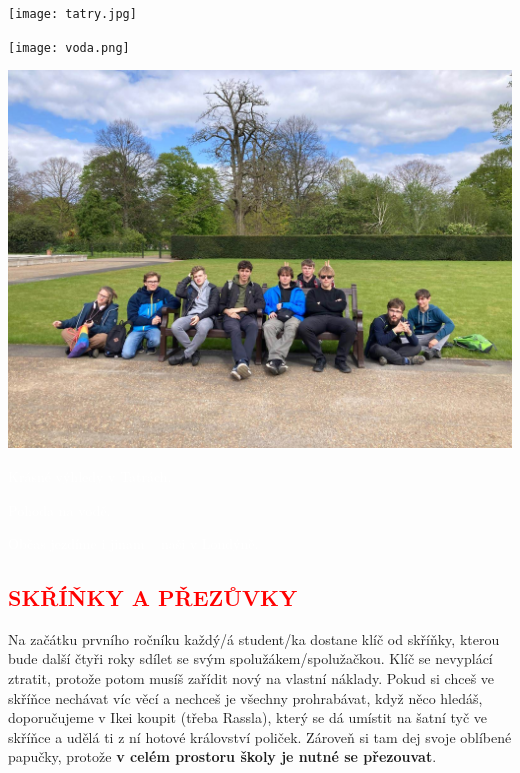 \documentclass[a5paper, twoside]{article}
\newcommand{\boxik}[2]{
  \begin{tcolorbox}[
    sharp corners,
    colback = #1,
    boxrule = 0pt,
    grow to left by = 25pt,
    grow to right by = 25pt,
    right = 22pt,
    left = 22pt%
  ]
    #2
  \end{tcolorbox}
}
\newcommand{\podnadpis}[2]{
  \subsection*{\textcolor{#2}{#1}}
}
\begin{document}
\smallskip
\boxik{red}{
\begin{minipage}{\linewidth}
  \begin{minipage}{0.32\linewidth}
    \texttt{[image: tatry.jpg]}
  \end{minipage}
  \hfill
  \begin{minipage}{0.32\linewidth}
    \texttt{[image: voda.png]}
  \end{minipage}
  \hfill
  \begin{minipage}{0.32\linewidth}
    \includegraphics[width=\linewidth]{londyn.jpg}
  \end{minipage}
\end{minipage}
\newline
\noindent
\begin{minipage}{\linewidth}
  \vspace{0.75em}
  \begin{minipage}{0.32\linewidth}
    \centering \textcolor{white}{Krásné výhledy v Tatrách.}
  \end{minipage}
  \hfill
  \begin{minipage}{0.32\linewidth}
    \centering \textcolor{white}{Pohoda na vodě.}
  \end{minipage}
  \hfill
  \begin{minipage}{0.32\linewidth}
    \centering \textcolor{white}{Občas jezdíme i jinam -- naši v Londýně.}
  \end{minipage}
\end{minipage}
}

\podnadpis{SKŘÍŇKY A PŘEZŮVKY}{red}
Na začátku prvního ročníku každý/á student/ka dostane klíč od skříňky, kterou bude další čtyři roky sdílet se svým spolužákem/spolužačkou. Klíč se nevyplácí ztratit, protože potom musíš zařídit nový na vlastní náklady. Pokud si chceš ve skříňce nechávat víc věcí a nechceš je všechny prohrabávat, když něco hledáš, doporučujeme v Ikei koupit  (třeba Rassla), který se dá umístit na šatní tyč ve skříňce a udělá ti z ní hotové království poliček. Zároveň si tam dej svoje oblíbené papučky, protože \textbf{v celém prostoru školy je nutné se přezouvat}.
\end{document}
